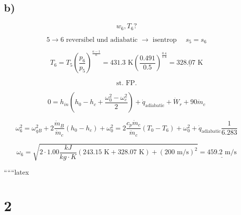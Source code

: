 

\subsection*{b)}

\[
w_6, T_6 ?
\]

\[
5 \rightarrow 6 \text{ reversibel und adiabatic } \rightarrow \text{ isentrop } \quad s_5 = s_6
\]

\[
T_6 = T_5 \left( \frac{p_6}{p_5} \right)^{\frac{\kappa - 1}{\kappa}} = 431.3 \text{ K} \left( \frac{0.491}{0.5} \right)^{\frac{0.4}{1.4}} = \underline{328.07 \text{ K}}
\]

\[
\text{st. FP.}
\]

\[
0 = h_{in} \left( h_0 - h_c + \frac{\omega_0^2 - \omega_c^2}{2} \right) + \dot{q}_{\text{adiabatic}} + \dot{W}_r + 90 \dot{m}_c
\]

\[
\omega_6^2 = \omega_{qB}^2 + 2 \frac{\dot{m}_B}{\dot{m}_c} (h_0 - h_c) + \omega_0^2 = 2 \frac{c_p \dot{m}_c}{\dot{m}_c} (T_0 - T_6) + \omega_0^2 + \dot{q}_{\text{adiabatic}} \frac{1}{6.283}
\]

\[
\omega_6 = \sqrt{2 \cdot 1.00 \frac{kJ}{kg \cdot K} (243.15 \text{ K} + 328.07 \text{ K}) + (200 \text{ m/s})^2} = \underline{459.2 \text{ m/s}}
\]

``````latex

\section*{2}